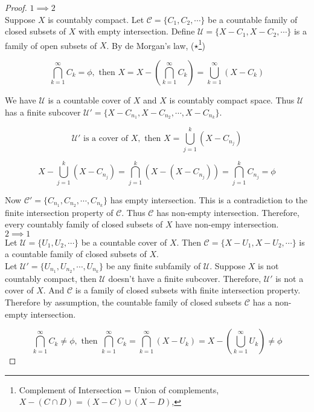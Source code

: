 \begin{proof}
	$1 \implies 2$\\
	Suppose $X$ is countably compact.
	Let $\mathcal{C} = \{C_1,C_2,\cdots\}$ be a countable family of closed subsets of $X$ with empty intersection.
	Define $\mathcal{U} = \{X-C_1, X-C_2, \cdots \}$ is a family of open subsets of $X$.
	By de Morgan's law, ($\star$\footnote{Complement of Intersection = Union of complements, $X - (C \cap D) = (X-C) \cup (X-D)$, })

	\[\bigcap_{k = 1}^\infty C_k = \phi, \text{ then } X =  X - \left(\bigcap_{k = 1}^\infty C_k\right) = \bigcup_{k = 1}^\infty (X-C_k)\]

	We have $\mathcal{U}$ is a countable cover of $X$ and $X$ is countably compact space.
	Thus $\mathcal{U}$ has a finite subcover $\mathcal{U}' = \{X-C_{n_1},X-C_{n_2},\cdots,X-C_{n_k}\}$.

	\[ \mathcal{U}' \text{ is a cover of } X, \text{ then } X = \bigcup_{j = 1}^k \left( X-C_{n_j} \right)\]

	\[X - \bigcup_{j = 1}^k \left( X-C_{n_j} \right) = \bigcap_{j = 1}^k \left( X - \left( X - C_{n_j} \right) \right) = \bigcap_{j = 1}^k C_{n_j} = \phi \]

	Now $\mathcal{C}' = \{ C_{n_1},C_{n_2},\cdots,C_{n_k}\}$ has empty intersection.
	This is a contradiction to the finite intersection property of $\mathcal{C}$.
	Thus $\mathcal{C}$ has non-empty intersection.
	Therefore, every countably family of closed subsets of $X$ have non-empy intersection.\\

	$2 \implies 1$\\

	Let $\mathcal{U}=\{ U_1, U_2, \cdots \}$ be a countable cover of $X$.
	Then $\mathcal{C} = \{ X-U_1,X-U_2,\cdots \}$ is a countable family of closed subsets of $X$.\\

	Let $\mathcal{U}'= \{ U_{n_1},U_{n_2},\cdots,U_{n_k}\}$ be any finite subfamily of $\mathcal{U}$.
	Suppose $X$ is not countably compact, then $\mathcal{U}$ doesn't have a finite subcover.
	Therefore, $\mathcal{U}'$ is not a cover of $X$.
	And $\mathcal{C}$ is a family of closed subsets with finite intersection property.\\

	Therefore by assumption, the countable family of closed subsets $\mathcal{C}$ has a non-empty intersection.

	\[ \bigcap_{k=1}^\infty C_k \ne \phi, \text{ then } \bigcap_{k=1}^\infty C_k = \bigcap_{k=1}^\infty \left( X - U_k \right) = X - \left( \bigcup_{k=1}^\infty U_k \right) \ne \phi \]


\end{proof}
